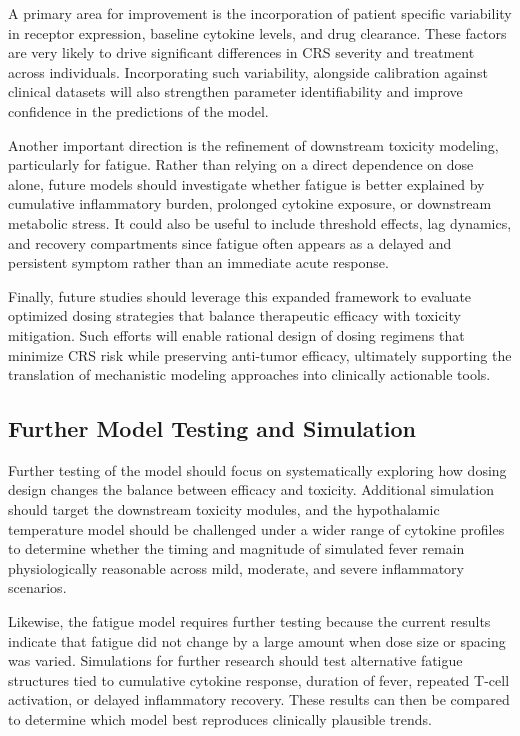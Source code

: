 \documentclass[11pt]{article}
\begin{document}
A primary area for improvement is the incorporation of patient specific variability in receptor expression, baseline cytokine levels, and drug clearance. These factors are very likely to drive significant differences in CRS severity and treatment across individuals. Incorporating such variability, alongside calibration against clinical datasets will also strengthen parameter identifiability and improve confidence in the predictions of the model.
\par\medskip

Another important direction is the refinement of downstream toxicity modeling, particularly for fatigue. Rather than relying on a direct dependence on dose alone, future models should investigate whether fatigue is better explained by cumulative inflammatory burden, prolonged cytokine exposure, or downstream metabolic stress. It could also be useful to include threshold effects, lag dynamics, and recovery compartments since fatigue often appears as a delayed and persistent symptom rather than an immediate acute response.
\par\medskip

Finally, future studies should leverage this expanded framework to evaluate optimized dosing strategies that balance therapeutic efficacy with toxicity mitigation. Such efforts will enable rational design of dosing regimens that minimize CRS risk while preserving anti-tumor efficacy, ultimately supporting the translation of mechanistic modeling approaches into clinically actionable tools.
\par\medskip

\subsection{Further Model Testing and Simulation}

Further testing of the model should focus on systematically exploring how dosing design changes the balance between efficacy and toxicity. Additional simulation should target the downstream toxicity modules, and the hypothalamic temperature model should be challenged under a wider range of cytokine profiles to determine whether the timing and magnitude of simulated fever remain physiologically reasonable across mild, moderate, and severe inflammatory scenarios.
\par\medskip

Likewise, the fatigue model requires further testing because the current results indicate that fatigue did not change by a large amount when dose size or spacing was varied. Simulations for further research should test alternative fatigue structures tied to cumulative cytokine response, duration of fever, repeated T-cell activation, or delayed inflammatory recovery. These results can then be compared to determine which model best reproduces clinically plausible trends.
\par\medskip
\end{document}
